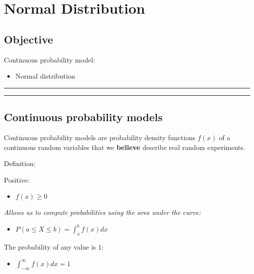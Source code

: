 \documentclass[
]{book}
\providecommand{\tightlist}{%
  \setlength{\itemsep}{0pt}\setlength{\parskip}{0pt}}
\begin{document}
\hypertarget{normal-distribution}{%
\chapter{Normal Distribution}\label{normal-distribution}}

\hypertarget{objective-7}{%
\section{Objective}\label{objective-7}}

Continuous probability model:

\begin{itemize}
\tightlist
\item
  Normal distribution
\end{itemize}

\begin{center}\rule{0.5\linewidth}{0.5pt}\end{center}

\begin{center}\rule{0.5\linewidth}{0.5pt}\end{center}

\hypertarget{continuous-probability-models-1}{%
\section{Continuous probability models}\label{continuous-probability-models-1}}

Continuous probability models are probability density functions \(f(x)\) of a continuous random variables that we \textbf{believe} describe real random experiments.

Definition:

Positive:

\begin{itemize}
\tightlist
\item
  \(f(x) \geq 0\)
\end{itemize}

\emph{Allows us to compute probabilities using the area under the curve:}

\begin{itemize}
\tightlist
\item
  \(P(a\leq X \leq b)=\int_{a}^{b} f(x) dx\)
\end{itemize}

The probability of any value is \(1\):

\begin{itemize}
\tightlist
\item
  \(\int_{-\infty}^{\infty} f(x) dx = 1\)
\end{itemize}
\end{document}
